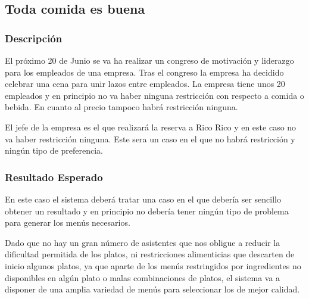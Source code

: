 \documentclass{article}
\begin{document}
\subsection{Toda comida es buena}
\subsubsection{Descripción}
El próximo 20 de Junio se va ha realizar un congreso de motivación y liderazgo para los empleados de una empresa. Tras el congreso la empresa ha decidido celebrar una cena para unir lazos entre empleados. La empresa tiene unos 20 empleados y en principio no va haber ninguna restricción con respecto a comida o bebida. En cuanto al precio tampoco habrá restricción ninguna.
\par
El jefe de la empresa es el que realizará la reserva a Rico Rico y en este caso no va haber restricción ninguna. Este sera un caso en el que no habrá restricción y ningún tipo de preferencia.

\subsubsection{Resultado Esperado}
En este caso el sistema deberá tratar una caso en el que debería ser sencillo obtener un resultado y en principio no debería tener ningún tipo de problema para generar los menús necesarios.
\par
Dado que no hay un gran número de asistentes que nos obligue a reducir la dificultad permitida de los platos, ni restricciones alimenticias que descarten de inicio algunos platos, ya que aparte de los menús restringidos por ingredientes no disponibles en algún plato o malas combinaciones de platos, el sistema va a disponer de una amplia variedad de menús para seleccionar los de mejor calidad.
\end{document}
